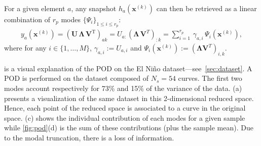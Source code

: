 For a given element $a$, any snapshot $h_a(\mathbf{x}^{(k)})$ can then be retrieved as a linear combination of $r_{p}$ modes $\{\Psi_i\}_{1\leq i \leq r_p}$:
\begin{align}\label{eq:gppod}
y_a(\mathbf{x}^{(k)}) 
= (\mathbf{U}\,\mathbf{\Lambda}\,\mathbf{V}^{\mathrm{T}})_{ak} 
= U_{a:}(\mathbf{\Lambda}\,\mathbf{V}^T)_{:k}=\sum_{i=1}^{r_{p}}\,\gamma_{a,i}\,\Psi_i(\mathbf{x}^{(k)}),
\end{align}
where for any $i\in\{1,\ldots,M\}$, $\gamma_{a,i}:=U_{a,i}$ and $\Psi_i(\mathbf{x}^{(k)}):=(\boldsymbol{\Lambda}\mathbf{V}^T)_{i,k}$. 

 is a visual explanation of the POD on the El Ni\~no dataset---see~\cref{sec:dataset}. A POD is performed on the dataset composed of $N_s=54$ curves. The first two modes account respectively for 73\% and 15\% of the variance of the data. (a) presents a visualization of the same dataset in this 2-dimensional reduced space. Hence, each point of the reduced space is associated to a curve in the original space. (c) shows the individual contribution of each modes for a given sample while \cref{fig:pod}(d) is the sum of these contributions (plus the sample mean). Due to the modal truncation, there is a loss of information.

